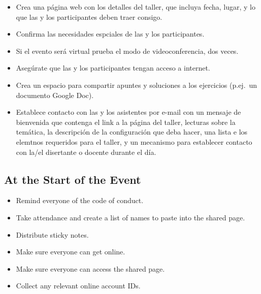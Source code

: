\begin{itemize}

\item
  Crea una página web con los detalles del taller,
  que incluya fecha,
  lugar,
  y lo que las y los participantes deben traer consigo.

\item
  Confirma las necesidades espciales de las y los participantes.

\item
  Si el evento será virtual prueba el modo de videoconferencia, dos veces.

\item
  Asegúrate que las y los participantes tengan acceso a internet.

\item
  Crea un espacio para compartir apuntes y soluciones a los ejercicios (p.ej.\ un documento Google Doc).

\item
  Establece contacto con las y los asistentes por e-mail con un mensaje de bienvenida que contenga
  el link a la página del taller,
  lecturas sobre la temática,
  la descripción de la configuración que deba hacer,
  una lista e los elemtnos requeridos para el taller,
  y un mecanismo para establecer contacto con la/el disertante o docente durante el día.

\end{itemize}

\subsection*{At the Start of the Event}

\begin{itemize}

\item
  Remind everyone of the code of conduct.

\item
  Take attendance
  and create a list of names to paste into the shared page.

\item
  Distribute sticky notes.

\item
  Make sure everyone can get online.
  
\item
  Make sure everyone can access the shared page.

\item
  Collect any relevant online account IDs.

\end{itemize}

